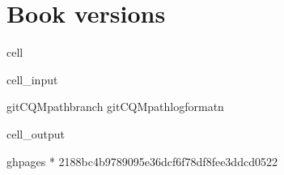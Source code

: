 \documentclass[letterpaper,table,10pt,english]{jupyterBook}
\begin{document}
\section{Book versions}
\label{\detokenize{tests/build_versions_checks:book-versions}}
\begin{sphinxuseclass}{cell}\begin{sphinxVerbatimInput}

\begin{sphinxuseclass}{cell_input}
\begin{sphinxVerbatim}[commandchars=\\\{\}]
  
git\PYGZhy{}CQMpathbranch
git\PYGZhy{}CQMpathlog\PYGZhy{}\PYGZhy{}format\PYGZhy{}n
\end{sphinxVerbatim}

\end{sphinxuseclass}\end{sphinxVerbatimInput}
\begin{sphinxVerbatimOutput}

\begin{sphinxuseclass}{cell_output}
\begin{sphinxVerbatim}[commandchars=\\\{\}]
  gh\PYGZhy{}pages
* 
2188bc4b9789095e36dcf6f78df8fee3ddcd0522
\end{sphinxVerbatim}

\end{sphinxuseclass}\end{sphinxVerbatimOutput}

\end{sphinxuseclass}
\end{document}

